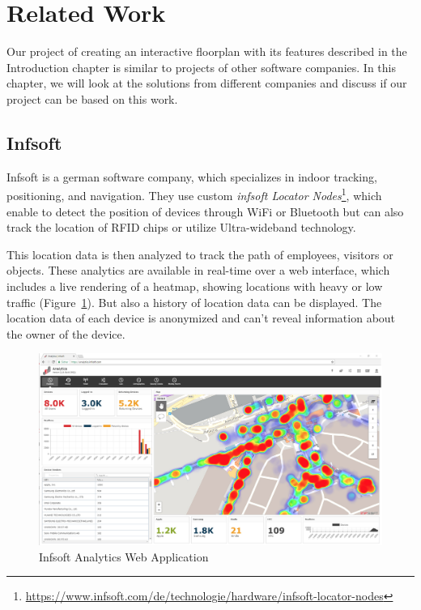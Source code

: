 \section{Related Work}

Our project of creating an interactive floorplan with its features described in the Introduction chapter is similar to projects of other software companies. In this chapter, we will look at the solutions from different companies and discuss if our project can be based on this work.

\subsection{Infsoft}

Infsoft is a german software company, which specializes in indoor tracking, positioning, and navigation. They use custom \emph{infsoft Locator Nodes}\footnote{\url{https://www.infsoft.com/de/technologie/hardware/infsoft-locator-nodes}}, which enable to detect the position of devices through WiFi or Bluetooth but can also track the location of RFID chips or utilize Ultra-wideband technology.

This location data is then analyzed to track the path of employees, visitors or objects. These analytics are available in real-time over a web interface, which includes a live rendering of a heatmap, showing locations with heavy or low traffic (Figure~\ref{fig:InfsoftApplication}). But also a history of location data can be displayed. The location data of each device is anonymized and can't reveal information about the owner of the device. 

\begin{figure}[!hb]
    \centering
    \includegraphics[width=0.9\linewidth]{images/Infsoft}
    \caption{Infsoft Analytics Web Application}
    \label{fig:InfsoftApplication}
\end{figure}

